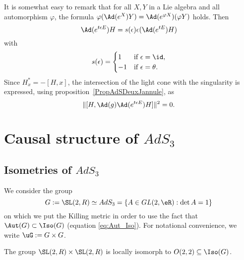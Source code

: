 It is somewhat easy to remark that for all $X,Y$ in a Lie algebra and all automorphism $\varphi$, the formula $\varphi(\Ad(e^X)Y)=\Ad(e^{\varphi X})(\varphi Y)$ holds. Then
\begin{equation}
\Ad(e^{t\epsilon E})H=s(\epsilon)\epsilon(\Ad(e^{tE})H)
\end{equation}
with
\[
  s(\epsilon)=
\begin{cases}
1&\text{if }\epsilon=\id,\\
-1&\text{if }\epsilon=\theta.
\end{cases}
\]
Since $H^*_x=-[H,x]$, the intersection of the light cone with the singularity is expressed, using proposition~\ref{PropAdSDeuxJannule}, as
\begin{equation}
    \|[H,\Ad(g)\Ad(e^{t\epsilon E})H]\|^2=0.
\end{equation}

\section{Causal structure of \texorpdfstring{$AdS_3$}{AdS3}}

\subsection{Isometries of \texorpdfstring{$AdS_3$}{AdS3}}

We consider the group
\[
   G:=\SL(2,R)\simeq AdS_3=\{A\in GL(2,\eR):\det A=1\}
\]
on which we put the Killing metric in order to use the fact that $\Aut(G)\subset\Iso(G)$ (equation \eqref{eq:Aut_Iso}). For notational convenience, we write $\uG:=G\times G$.

\begin{lemma}
The group $\SL(2,R)\times\SL(2,R)$ is locally isomorph to $O(2,2)\subseteq \Iso(G)$.
\end{lemma}

